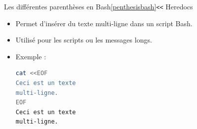 \documentclass{beamer}
\begin{document}
    \begin{frame}[fragile]{Les différentes parenthèses en Bash\cref{penthesisbash}}{\lstinline{<<} Heredocs}
        \begin{itemize}
            \item Permet d'insérer du texte multi-ligne dans un script Bash.
            \item Utilisé pour les scripts ou les messages longs.
            \item Exemple :
            \begin{lstlisting}[language=bash]
cat <<EOF
Ceci est un texte
multi-ligne.
EOF
Ceci est un texte
multi-ligne.
            \end{lstlisting}
        \end{itemize}
    \end{frame}
\end{document}
